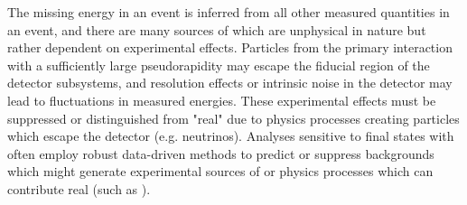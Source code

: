The missing energy in an event is inferred from all other measured quantities in an event, and there are many sources of \MET which are unphysical in nature but rather dependent on experimental effects. Particles from the primary interaction with a sufficiently large pseudorapidity may escape the fiducial region of the detector subsystems, and resolution effects or intrinsic noise in the detector may lead to fluctuations in measured energies. These experimental effects must be suppressed or distinguished from "real" \MET due to physics processes creating particles which escape the detector (e.g. neutrinos). Analyses sensitive to final states with \MET often employ robust data-driven methods to predict or suppress backgrounds which might generate experimental sources of \MET or physics processes which can contribute real \MET (such as \znunu).

